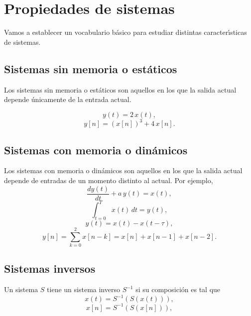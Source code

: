 \section{Propiedades de sistemas}

Vamos a establecer un vocabulario b\'{a}sico para estudiar distintas
caracter\'{\i}sticas de sistemas.

\subsection{Sistemas sin memoria o est\'{a}ticos}

Los sistemas sin memoria o est\'{a}ticos son aquellos en los que la
salida actual depende \'{u}nicamente de la entrada actual.

\begin{equation}
  y\left( t\right) = 2 \, x\left(t\right) ,
\end{equation}
\begin{equation}
  y[n]=(x[n])^{3} + 4 \, x[n].
\end{equation}

\subsection{Sistemas con memoria o din\'{a}micos}

Los sistemas con memoria o din\'{a}micos son aquellos en los que la
salida actual depende de entradas de un momento distinto al actual.
Por ejemplo,
\begin{equation}
 \frac{dy(t)}{dt} + a \, y(t) = x(t),
\end{equation}
\begin{equation}
 \int_{t=0}^{T} x(t) \, dt = y(t),
\end{equation}
\begin{equation}
  y(t)=x(t)-x(t-\tau ),
\end{equation}
\begin{equation}
  y\left[ n\right] =\sum_{k=0}^{2}x[n-k]=x[n]+x[n-1]+x[n-2].
\end{equation}

\subsection{Sistemas inversos}

Un sistema $S$ tiene un sistema inverso $S^{-1}$ si su composici\'{o}n
es tal que
\begin{equation}
  x\left( t\right) =S^{-1}\left( S\left( x\left( t\right) \right) \right) ,
\end{equation}
\begin{equation}
  x\left[ n\right] =S^{-1}\left( S\left( x\left[ n\right] \right) \right) ,
\end{equation}

